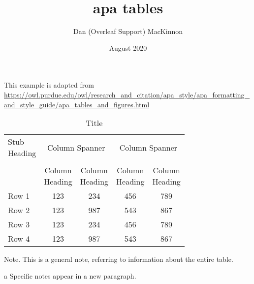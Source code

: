 \documentclass[12pt] {article}
\title{apa tables}
\author{Dan (Overleaf Support) MacKinnon}
\date{August 2020}
\begin{document}
\maketitle


This example is adapted from \url{https://owl.purdue.edu/owl/research_and_citation/apa_style/apa_formatting_and_style_guide/apa_tables_and_figures.html}


\begin{table}[!htb]
    \begin{threeparttable}[b]
   
    \caption{Title}
    \label{tbl:1}
    \centering
    \begin{tabular}{lcccc}
        \makecell[c]{Stub \\ Heading} & \multicolumn{2}{c}{Column Spanner} & \multicolumn{2}{c}{Column Spanner}\\
        \cmidrule(lr){2-5} \\
        {} &  \makecell[c]{Column \\ Heading} &  \makecell[c]{Column \\ Heading} &  \makecell[c]{Column \\ Heading}  & \makecell[c]{Column \\ Heading} \\
        \cmidrule(lr){1-5}
        Row 1  & 123  & 234\tnote{a} & 456  & 789 \\
        Row 2  & 123 & 987 & 543 & 867 \\
         \cmidrule(lr){1-5}
        Row 3  & 123  & 234 & 456  & 789 \\
        Row 4  & 123 & 987 & 543 & 867 \\
    \end{tabular}
    \vspace{-10pt}
    \begin{tablenotes}    
    \item  \doublespacing Note. \textnormal{This is a general note, referring to information about the entire table.}
    \item[a] Specific notes appear in a new paragraph.
    \end{tablenotes}    
    \end{threeparttable}
\end{table}
\end{document}
